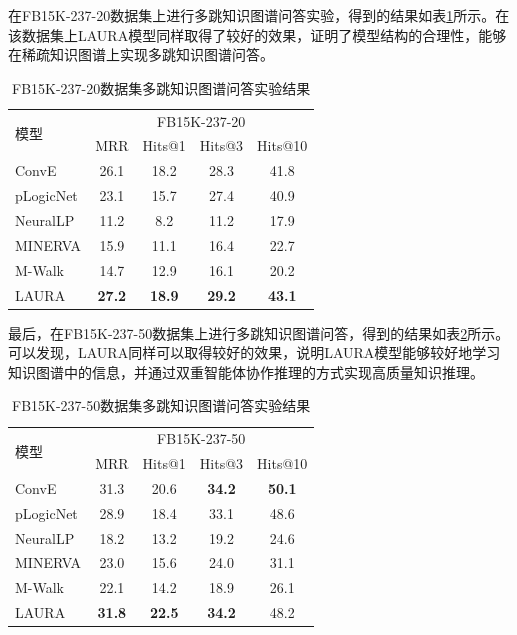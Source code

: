 \documentclass[algorithmlist, AutoFakeBold, AutoFakeSlant, figurelist, tablelist, nomlist, engineering]{seuthesix}
\begin{document}
在FB15K-237-20数据集上进行多跳知识图谱问答实验，得到的结果如表\ref{Experiment2_FB15K-237-20}所示。在该数据集上LAURA模型同样取得了较好的效果，证明了模型结构的合理性，能够在稀疏知识图谱上实现多跳知识图谱问答。
\begin{table}[]
  \centering
  \begin{tabular*}{0.95\textwidth}{@{\extracolsep{\fill}}lcccc}
  \toprule[1pt]
  \multirow{2}{*}{模型} & \multicolumn{4}{c}{FB15K-237-20}   \\
    & MRR & Hits@1 & Hits@3 & Hits@10 \\ \hline
  ConvE & 26.1 & 18.2 & 28.3 & 41.8 \\
  pLogicNet & 23.1 & 15.7 & 27.4 & 40.9 \\
  NeuralLP & 11.2 & 8.2 & 11.2 & 17.9 \\
  MINERVA & 15.9 & 11.1 & 16.4 & 22.7 \\
  M-Walk & 14.7 & 12.9 & 16.1 & 20.2 \\
  LAURA & \textbf{27.2} & \textbf{18.9} & \textbf{29.2} & \textbf{43.1} \\
  \bottomrule[1pt]
  \end{tabular*}
  \caption{FB15K-237-20数据集多跳知识图谱问答实验结果}
  \label{Experiment2_FB15K-237-20}
\end{table}

最后，在FB15K-237-50数据集上进行多跳知识图谱问答，得到的结果如表\ref{Experiment2_FB15K-237-50}所示。可以发现，LAURA同样可以取得较好的效果，说明LAURA模型能够较好地学习知识图谱中的信息，并通过双重智能体协作推理的方式实现高质量知识推理。
\begin{table}[]
  \centering
  \begin{tabular*}{0.95\textwidth}{@{\extracolsep{\fill}}lcccc}
  \toprule[1pt]
  \multirow{2}{*}{模型} & \multicolumn{4}{c}{FB15K-237-50}   \\
    & MRR & Hits@1 & Hits@3 & Hits@10 \\ \hline
  ConvE & 31.3 & 20.6 & \textbf{34.2} & \textbf{50.1} \\
  pLogicNet & 28.9 & 18.4 & 33.1 & 48.6 \\
  NeuralLP & 18.2 & 13.2 & 19.2 & 24.6 \\
  MINERVA & 23.0 & 15.6 & 24.0 & 31.1 \\
  M-Walk & 22.1 & 14.2 & 18.9 & 26.1 \\
  LAURA & \textbf{31.8} & \textbf{22.5} & \textbf{34.2} & 48.2 \\
  \bottomrule[1pt]
  \end{tabular*}
  \caption{FB15K-237-50数据集多跳知识图谱问答实验结果}
  \label{Experiment2_FB15K-237-50}
\end{table}
\end{document}

